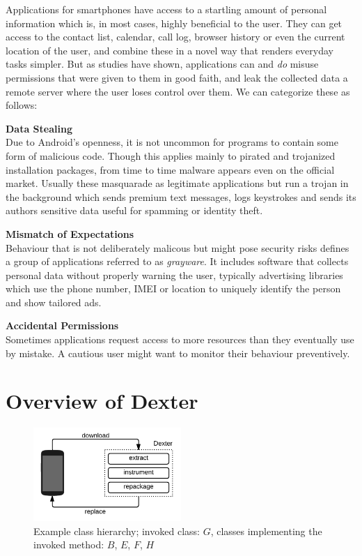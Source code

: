 \documentclass[12pt,twoside,notitlepage]{report}
\begin{document}
Applications for smartphones have access to a startling amount of personal information which is, in most cases, highly beneficial to the user. They can get access to the contact list, calendar, call log, browser history or even the current location of the user, and combine these in a novel way that renders everyday tasks simpler. But as studies have shown\cite{web:Appthority}\cite{web:HuffingtonOneInThree}, applications can and \emph{do} misuse permissions that were given to them in good faith, and leak the collected data a remote server where the user loses control over them. We can categorize these as follows:
\begin{description}
\item \textbf{Data Stealing} \\
Due to Android's openness, it is not uncommon for programs to contain some form of malicious code. Though this applies mainly to pirated and trojanized installation packages\cite{Zhou:2012:DRS:2133601.2133640}, from time to time malware appears even on the official market\cite{web:LookoutPlayRemoval}. Usually these masquarade as legitimate applications but run a trojan in the background which sends premium text messages, logs keystrokes and sends its authors sensitive data useful for spamming or identity theft.

\item \textbf{Mismatch of Expectations} \\
Behaviour that is not deliberately malicous but might pose security risks defines a group of applications referred to as \emph{grayware}. It includes software that collects personal data without properly warning the user, typically advertising libraries which use the phone number, IMEI or location to uniquely identify the person and show tailored ads.

\item \textbf{Accidental Permissions} \\
Sometimes applications request access to more resources than they eventually use by mistake. A cautious user might want to monitor their behaviour preventively. 
\end{description}



\section{Overview of Dexter}

\begin{figure}
	\centerline{	
		\includegraphics[width=0.5\textwidth]{figs/fig_intro_overview.png}
	}
	\caption{Example class hierarchy; invoked class: $G$, classes implementing the invoked method: $B$, $E$, $F$, $H$}
	\label{fig:Introduction_Overview}
\end{figure}
\end{document}
